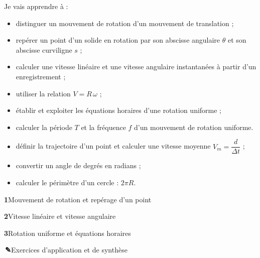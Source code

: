 \documentclass[11pt,a4paper]{article}
\begin{document}
\begin{minipage}[t]{0.485\linewidth}
\begin{tcolorbox}[enhanced,colback=cBlue!5,colframe=cBlue!5,arc=3mm,left=4mm,right=4mm,top=3mm,bottom=3mm,
  title={\sffamily\bfseries\color{cBlue}Objectifs du chapitre},detach title,before upper={\tcbtitle\par\smallskip},fontupper=\small]
Je vais apprendre à :
\begin{itemize}
  \item distinguer un mouvement de rotation d’un mouvement de translation ;
  \item repérer un point d’un solide en rotation par son abscisse angulaire $\theta$ et son abscisse curviligne $s$ ;
  \item calculer une vitesse linéaire et une vitesse angulaire instantanées à partir d’un enregistrement ;
  \item utiliser la relation $V = R\,\omega$ ;
  \item établir et exploiter les équations horaires d’une rotation uniforme ;
  \item calculer la période $T$ et la fréquence $f$ d’un mouvement de rotation uniforme.
\end{itemize}
\end{tcolorbox}
\end{minipage}\hfill
\begin{minipage}[t]{0.485\linewidth}
\begin{tcolorbox}[enhanced,colback=cGreen!6,colframe=cGreen!6,arc=3mm,left=4mm,right=4mm,top=3mm,bottom=3mm,
  title={\sffamily\bfseries\color{cGreen}Je dois déjà savoir},detach title,before upper={\tcbtitle\par\smallskip},fontupper=\small]
\begin{itemize}
  \item définir la trajectoire d’un point et calculer une vitesse moyenne $V_m = \dfrac{d}{\Delta t}$ ;
  \item convertir un angle de degrés en radians ;
  \item calculer le périmètre d’un cercle : $2\pi R$.
\end{itemize}
\end{tcolorbox}
\vspace{1mm}
\begin{tcolorbox}[enhanced,colback=cOrange!7,colframe=cOrange!7,arc=3mm,left=4mm,right=4mm,top=3mm,bottom=3mm,
  title={\sffamily\bfseries\color{cOrange}Plan du chapitre},detach title,before upper={\tcbtitle\par\smallskip},fontupper=\small\sffamily]
\textcolor{cOrange}{\textbf{1}}\enspace Mouvement de rotation et repérage d’un point\par
\textcolor{cOrange}{\textbf{2}}\enspace Vitesse linéaire et vitesse angulaire\par
\textcolor{cOrange}{\textbf{3}}\enspace Rotation uniforme et équations horaires\par
\textcolor{cOrange}{\textbf{\,✎}}\enspace Exercices d’application et de synthèse
\end{tcolorbox}
\end{minipage}
\end{document}
